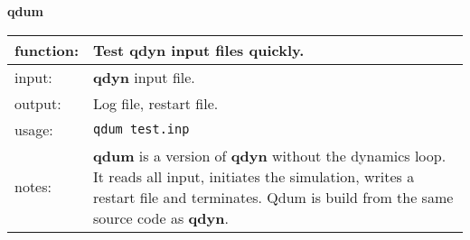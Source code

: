 \documentclass[a4paper,10pt]{article}
\begin{document}
\textbf{qdum}\\
\begin{tabularx}{\textwidth}{|l|X|}
\hline
 function: &   Test \textbf{qdyn} input files quickly.\\\hline
 input:    &   \textbf{qdyn} input file.\\\hline
 output:   &   Log file, restart file.\\\hline
 usage:    &   \verb"qdum test.inp"\\\hline
 notes:    &   \textbf{qdum} is a version of \textbf{qdyn} without the dynamics loop. It reads all input, initiates the
               simulation, writes a restart file and terminates. Qdum is build from the same source
               code as \textbf{qdyn}.\\
\hline
\end{tabularx}

\newpage
\end{document}

